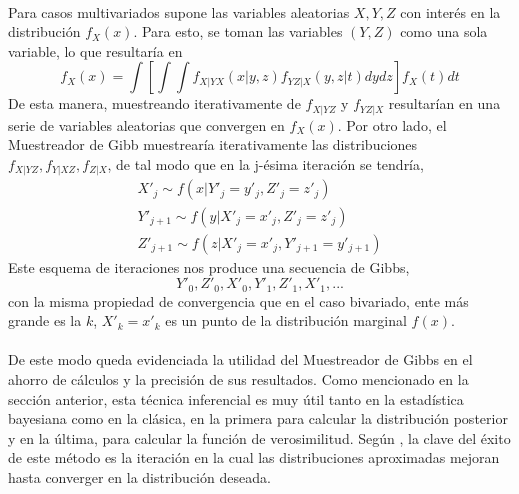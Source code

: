 \\
Para casos multivariados \cite{casella1992explaining} supone las variables aleatorias $X,Y,Z$ con inter\'es en la distribuci\'on $f_X(x)$. Para esto, se toman las variables $(Y,Z)$ como una sola variable, lo que resultar\'ia en\\
\[f_X(x)= \int [ \int \int f_{X|YX}(x|y,z)f_{YZ|X}(y,z|t)dy dz] f_X(t) dt\]
De esta manera, muestreando iterativamente de $f_{X|YZ}$ y $f_{YZ|X}$ resultar\'ian en una serie de variables aleatorias que convergen en $f_X(x)$. Por otro lado, el Muestreador de Gibb muestrear\'ia iterativamente las distribuciones $f_{X|YZ}, f_{Y|XZ}, f_{Z|X}$, de tal modo que en la j-\'esima iteraci\'on se tendr\'ia,\\
\begin{align*}
X'_j \sim f(x|Y'_j = y'_j, Z'_j=z'_j)\\
Y'_{j+1} \sim f(y|X'_j=x'_j, Z'_j=z'_j)\\
Z'_{j+1} \sim f(z|X'_j=x'_j, Y'_{j+1}=y'_{j+1})
\end{align*}
Este esquema de iteraciones nos produce una secuencia de Gibbs,\\
\[Y'_0,Z'_0,X'_0,Y'_1,Z'_1,X'_1,...\]
con la misma propiedad de convergencia que en el caso bivariado, ente m\'as grande es la $k$, $X'_k=x'_k$ es un punto de la distribuci\'on marginal $f(x)$.\\
\\
De este modo queda evidenciada la utilidad del Muestreador de Gibbs en el ahorro de c\'alculos y la precisi\'on de sus resultados. Como mencionado en la secci\'on anterior, esta t\'ecnica inferencial es muy \'util tanto en la estad\'istica bayesiana como en la cl\'asica, en la primera para calcular la distribuci\'on posterior y en la \'ultima, para calcular la funci\'on de verosimilitud. Seg\'un \cite{gelman2014bayesian}, la clave del \'exito de este m\'etodo es la iteraci\'on en la cual las distribuciones aproximadas mejoran hasta converger en la distribuci\'on deseada.\\
